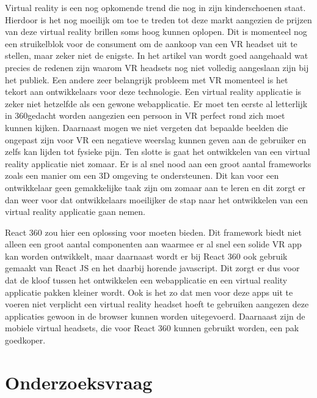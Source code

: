 Virtual reality is een nog opkomende trend die nog in zijn kinderschoenen staat. Hierdoor is het nog moeilijk om toe te treden tot deze markt aangezien de prijzen van deze virtual reality brillen soms hoog kunnen oplopen. Dit is momenteel nog een struikelblok voor de consument om de aankoop van een VR  headset uit te stellen, maar zeker niet de enigste. In het artikel van \autocite{Abarrera2017} wordt goed aangehaald wat precies de redenen zijn waarom VR headsets nog niet volledig aangeslaan zijn bij het publiek. Een andere zeer belangrijk probleem met VR momenteel is het tekort aan ontwikkelaars voor deze technologie. Een virtual reality applicatie is zeker niet hetzelfde als een gewone webapplicatie. Er moet ten eerste al letterlijk in 360\textdegree gedacht worden aangezien een persoon in VR perfect rond zich moet kunnen kijken. Daarnaast mogen we niet vergeten dat bepaalde beelden die ongepast zijn voor VR een negatieve weerslag kunnen geven aan de gebruiker en zelfs kan lijden tot fysieke pijn. Ten slotte is gaat het ontwikkelen van een virtual reality applicatie niet zomaar. Er is al snel nood aan een groot aantal frameworks zoals een manier om een 3D omgeving te ondersteunen. Dit kan voor een ontwikkelaar geen gemakkelijke taak zijn om zomaar aan te leren en dit zorgt er dan weer voor dat ontwikkelaars moeilijker de stap naar het ontwikkelen van een virtual reality applicatie gaan nemen.

React 360 zou hier een oplossing voor moeten bieden. Dit framework biedt niet alleen een groot aantal componenten aan waarmee er al snel een solide VR app kan worden ontwikkelt, maar daarnaast wordt er bij React 360 ook gebruik gemaakt van React JS en het daarbij horende javascript. Dit zorgt er dus voor dat de kloof tussen het ontwikkelen een webapplicatie en een virtual reality applicatie pakken kleiner wordt. Ook is het zo dat men voor deze apps uit te voeren niet verplicht een virtual reality headset hoeft te gebruiken aangezen deze applicaties gewoon in de browser kunnen worden uitegevoerd. Daarnaast zijn de mobiele virtual headsets, die voor React 360 kunnen gebruikt worden, een pak goedkoper.


\section{Onderzoeksvraag}
\label{sec:onderzoeksvraag}

